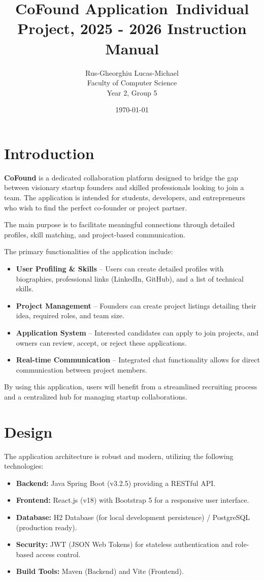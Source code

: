 \documentclass[12pt,a4paper]{article}
\title{\textbf{CoFound Application}\ \large Individual Project, 2025 - 2026 Instruction Manual}
\author{Rus-Gheorghiu Lucas-Michael \\ Faculty of Computer Science \\ Year 2, Group 5}
\date{\today}
\begin{document}
\maketitle

\tableofcontents
\newpage

\section{Introduction}
\textbf{CoFound} is a dedicated collaboration platform designed to bridge the gap between visionary startup founders and skilled professionals looking to join a team. The application is intended for students, developers, and entrepreneurs who wish to find the perfect co-founder or project partner.

The main purpose is to facilitate meaningful connections through detailed profiles, skill matching, and project-based communication.

The primary functionalities of the application include:
\begin{itemize}
    \item \textbf{User Profiling & Skills} – Users can create detailed profiles with biographies, professional links (LinkedIn, GitHub), and a list of technical skills.
    \item \textbf{Project Management} – Founders can create project listings detailing their idea, required roles, and team size.
    \item \textbf{Application System} – Interested candidates can apply to join projects, and owners can review, accept, or reject these applications.
    \item \textbf{Real-time Communication} – Integrated chat functionality allows for direct communication between project members.
\end{itemize}

By using this application, users will benefit from a streamlined recruiting process and a centralized hub for managing startup collaborations.

\section{Design}
The application architecture is robust and modern, utilizing the following technologies:

\begin{itemize}
    \item \textbf{Backend:} Java Spring Boot (v3.2.5) providing a RESTful API.
    \item \textbf{Frontend:} React.js (v18) with Bootstrap 5 for a responsive user interface.
    \item \textbf{Database:} H2 Database (for local development persistence) / PostgreSQL (production ready).
    \item \textbf{Security:} JWT (JSON Web Tokens) for stateless authentication and role-based access control.
    \item \textbf{Build Tools:} Maven (Backend) and Vite (Frontend).
\end{itemize}
\end{document}
